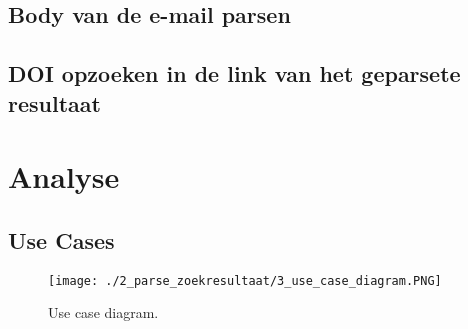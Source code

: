 \subsection{Body van de e-mail parsen}
\subsection{DOI opzoeken in de link van het geparsete resultaat}
\section{Analyse}
\subsection{Use Cases}
\begin{figure}
    \centering
    \texttt{[image: ./2\_parse\_zoekresultaat/3\_use\_case\_diagram.PNG]}
    \caption[Use case diagram.]{\label{fig:Use case diagram}Use case diagram.}
\end{figure}
\FloatBarrier
\newpage
